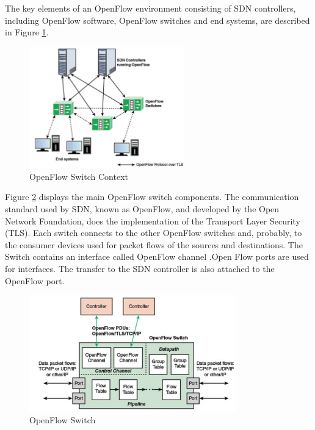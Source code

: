 \documentclass[
  oneside,
  11pt, a4paper,
  footinclude=true,
  headinclude=true,
  cleardoublepage=empty
]{scrbook}
\begin{document}
The key elements of an OpenFlow environment consisting of SDN controllers, including OpenFlow software, OpenFlow switches and end systems, are described in Figure \ref{OpenFlow Switch Context}.\par

\begin{figure}[H]
\begin{center}
  \includegraphics[width=0.6\textwidth]{img/switchdev.png}
\end{center}
  \caption{OpenFlow Switch Context ~\cite{stallings2015foundations}}
  \centering  
\label{OpenFlow Switch Context}
\end{figure}


Figure \ref{OpenFlow Switch} displays the main OpenFlow switch components. The communication standard used by SDN, known as OpenFlow, and developed by the Open Network Foundation, does the implementation of the Transport Layer Security (TLS). Each switch connects to the other OpenFlow switches and, probably, to the consumer devices used for packet flows of the sources and destinations. The Switch contains an interface called OpenFlow channel .Open Flow ports are used for interfaces. The transfer to the SDN controller is also attached to the OpenFlow port.\par

\begin{figure}[H]
\begin{center}
  \includegraphics[width=0.8\textwidth]{img/porswit.png}
\end{center}
  \caption{OpenFlow Switch ~\cite{stallings2015foundations}}
  \centering  
\label{OpenFlow Switch}
\end{figure}
\end{document}
